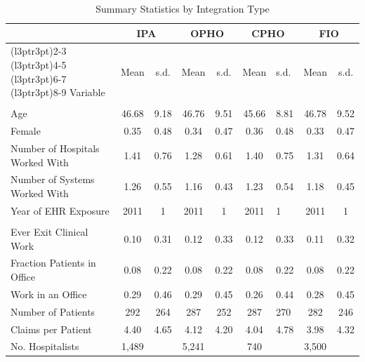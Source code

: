 \begin{table}[h]
\centering
\caption{\label{tab:tab:means_int}Summary Statistics by Integration Type}
\centering
\begin{tabular}[t]{lccccclcc}
\toprule
\multicolumn{1}{c}{ } & \multicolumn{2}{c}{IPA} & \multicolumn{2}{c}{OPHO} & \multicolumn{2}{c}{CPHO} & \multicolumn{2}{c}{FIO} \\
\cmidrule(l{3pt}r{3pt}){2-3} \cmidrule(l{3pt}r{3pt}){4-5} \cmidrule(l{3pt}r{3pt}){6-7} \cmidrule(l{3pt}r{3pt}){8-9}
Variable & Mean & s.d. & Mean & s.d. & Mean & s.d. & Mean & s.d.\\
\midrule
\addlinespace[0.3em]
\multicolumn{9}{l}{\textbf{Characteristics}}\\
\hspace{1em}Age & 46.68 & 9.18 & 46.76 & 9.51 & 45.66 & 8.81 & 46.78 & 9.52\\
\hspace{1em}Female & 0.35 & 0.48 & 0.34 & 0.47 & 0.36 & 0.48 & 0.33 & 0.47\\
\hspace{1em}Number of Hospitals Worked With & 1.41 & 0.76 & 1.28 & 0.61 & 1.40 & 0.75 & 1.31 & 0.64\\
\hspace{1em}Number of Systems Worked With & 1.26 & 0.55 & 1.16 & 0.43 & 1.23 & 0.54 & 1.18 & 0.45\\
\hspace{1em}Year of EHR Exposure & 2011 & 1 & 2011 & 1 & 2011 & 1 & 2011 & 1\\
\addlinespace[0.3em]
\multicolumn{9}{l}{\textbf{Outcomes}}\\
\hspace{1em}Ever Exit Clinical Work & 0.10 & 0.31 & 0.12 & 0.33 & 0.12 & 0.33 & 0.11 & 0.32\\
\hspace{1em}Fraction Patients in Office & 0.08 & 0.22 & 0.08 & 0.22 & 0.08 & 0.22 & 0.08 & 0.22\\
\hspace{1em}Work in an Office & 0.29 & 0.46 & 0.29 & 0.45 & 0.26 & 0.44 & 0.28 & 0.45\\
\hspace{1em}Number of Patients & 292 & 264 & 287 & 252 & 287 & 270 & 282 & 246\\
\hspace{1em}Claims per Patient & 4.40 & 4.65 & 4.12 & 4.20 & 4.04 & 4.78 & 3.98 & 4.32\\
No. Hospitalists & 1,489 &  & 5,241 &  & 740 &  & 3,500 & \\
\bottomrule
\end{tabular}
\end{table}
